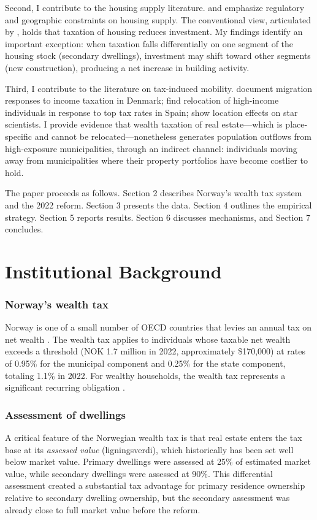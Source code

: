 \documentclass[12pt]{article}
\begin{document}
Second, I contribute to the housing supply literature. \citet{glaeser2018economic} and \citet{saiz2010geographic} emphasize regulatory and geographic constraints on housing supply. The conventional view, articulated by \citet{poterba1992taxation}, holds that taxation of housing reduces investment. My findings identify an important exception: when taxation falls differentially on one segment of the housing stock (secondary dwellings), investment may shift toward other segments (new construction), producing a net increase in building activity.

Third, I contribute to the literature on tax-induced mobility. \citet{kleven2014migration} document migration responses to income taxation in Denmark; \citet{agrawal2019relocation} find relocation of high-income individuals in response to top tax rates in Spain; \citet{moretti2017effect} show location effects on star scientists. I provide evidence that wealth taxation of real estate---which is place-specific and cannot be relocated---nonetheless generates population outflows from high-exposure municipalities, through an indirect channel: individuals moving away from municipalities where their property portfolios have become costlier to hold.

The paper proceeds as follows. Section 2 describes Norway's wealth tax system and the 2022 reform. Section 3 presents the data. Section 4 outlines the empirical strategy. Section 5 reports results. Section 6 discusses mechanisms, and Section 7 concludes.

\section{Institutional Background}

\subsubsection*{Norway's wealth tax} Norway is one of a small number of OECD countries that levies an annual tax on net wealth \citep{scheuer2021taxing, thoresen2012wealth}. The wealth tax applies to individuals whose taxable net wealth exceeds a threshold (NOK 1.7 million in 2022, approximately \$170,000) at rates of 0.95\% for the municipal component and 0.25\% for the state component, totaling 1.1\% in 2022. For wealthy households, the wealth tax represents a significant recurring obligation \citep{norwegian_tax_commission2022}.

\subsubsection*{Assessment of dwellings} A critical feature of the Norwegian wealth tax is that real estate enters the tax base at its \textit{assessed value} (ligningsverdi), which historically has been set well below market value. Primary dwellings were assessed at 25\% of estimated market value, while secondary dwellings were assessed at 90\%. This differential assessment created a substantial tax advantage for primary residence ownership relative to secondary dwelling ownership, but the secondary assessment was already close to full market value before the reform.
\end{document}
